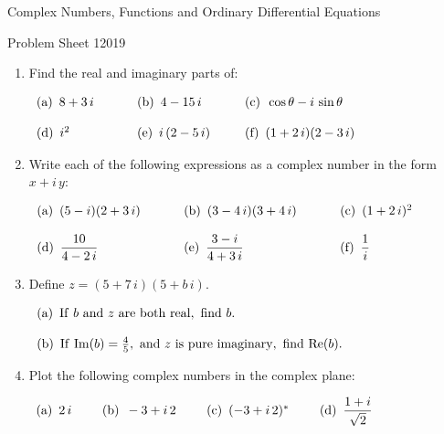 \documentclass[12pt]{article}
\begin{document}
\centerline{\Large Complex Numbers, Functions and Ordinary Differential Equations}
\bigskip\bigskip


\noindent
Problem Sheet 1\hfill 2019

\vskip-9pt\hrulefill


\bigskip





\begin{enumerate}

\item Find the real and imaginary parts of:

$
\begin{array}[h!]{lll}
{\rm (a)}\hskip5pt 8+3\,i\hskip24pt&
{\rm (b)}\hskip5pt 4-15\,i\hskip24pt&
{\rm (c)}\hskip5pt \cos\theta-i\,\sin\theta\\
\noalign{\vskip12pt}
{\rm (d)}\hskip5pt i^2&
{\rm (e)}\hskip5pt i\,(2-5\,i)&
{\rm (f)}\hskip5pt (1+2\,i)(2-3\,i)
\end{array}
$

\item  Write each of the following expressions as a complex number in the form $x+i\,y$:

$
\begin{array}[h!]{lll}
{\rm (a)}\hskip5pt (5-i)(2+3\,i)\hskip24pt&
{\rm (b)}\hskip5pt (3-4\,i)(3+4\,i)\hskip24pt&
{\rm (c)}\hskip5pt (1+2\,i)^2\\
\noalign{\vskip12pt}
{\rm (d)}\hskip5pt \displaystyle{10\over4-2\,i}&
{\rm (e)}\hskip5pt \displaystyle{3-i\over4+3\,i}&
{\rm (f)}\hskip5pt \displaystyle{1\over i}
\end{array}
$


\item Define $z=(5+7\,i)(5+b\,i)$.

$
\begin{array}[h!]{l}
{\rm (a)}\hskip5pt {\rm If}\ b\ {\rm and}\ z\ {\rm are\ both\ real,\ find}\ b.\\
\noalign{\vskip12pt}
{\rm (b)}\hskip5pt {\rm If}\ {\rm Im}(b)={4\over5},\ {\rm and}\ z\ {\rm is\ pure\ imaginary,\ find}\
{\rm Re}(b).
\end{array}
$

\item Plot the following complex numbers in the complex plane:

$\begin{array}[h!]{l}
{\rm (a)}\hskip5pt 2\,i\hskip24pt
{\rm (b)}\hskip5pt -3+i\,2\hskip24pt
{\rm (c)}\hskip5pt (-3+i\,2)^\ast\hskip24pt
{\rm (d)}\hskip5pt \displaystyle{1+i\over\sqrt{2}}\hskip24pt
\end{array}
$


\end{enumerate}
\end{document}
